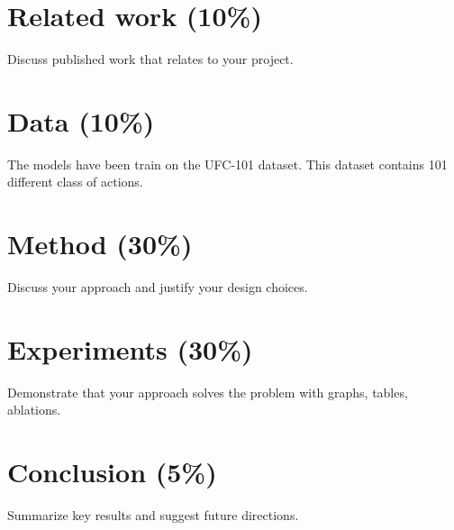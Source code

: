 \documentclass[journal]{IEEEtran}
\begin{document}


\section{Related work (10\%)}
Discuss published work that relates to your project.

\section{Data (10\%)}
The models have been train on the UFC-101 dataset. This dataset contains 101 different class of actions.

\section{Method (30\%)}
Discuss your approach and justify your design choices.

\section{Experiments (30\%)}
Demonstrate that your approach solves the problem with graphs, tables, ablations.

\section{Conclusion (5\%)}
Summarize key results and suggest future directions.




\end{document}
